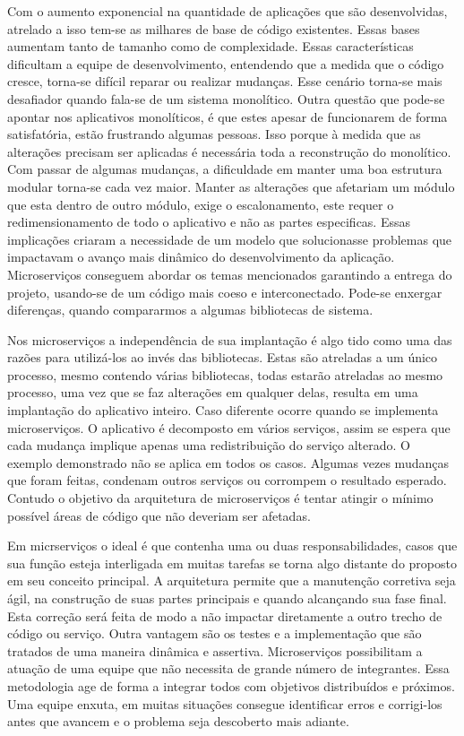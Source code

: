 Com o aumento exponencial na quantidade de aplicações que são desenvolvidas, atrelado a isso tem-se as milhares de base
de código existentes. Essas bases aumentam tanto de tamanho como de complexidade. Essas características dificultam a
equipe de desenvolvimento, entendendo que a medida que o código cresce, torna-se difícil reparar ou realizar mudanças.
Esse cenário torna-se mais desafiador quando fala-se de um sistema monolítico. Outra questão que pode-se apontar
nos aplicativos monolíticos, é que estes apesar de funcionarem de forma satisfatória, estão frustrando algumas pessoas.
Isso porque à medida que as alterações precisam ser aplicadas é necessária toda a reconstrução do monolítico. Com passar
de algumas mudanças, a dificuldade em manter uma boa estrutura modular torna-se cada vez maior. Manter as alterações
que  afetariam um módulo que esta dentro de outro módulo, exige o escalonamento, este requer o redimensionamento de todo
o aplicativo e não as partes especificas. Essas implicações criaram a necessidade de um modelo que solucionasse problemas
que impactavam o avanço mais dinâmico do desenvolvimento da aplicação.
Microserviços conseguem abordar os temas mencionados garantindo a entrega do projeto, usando-se de um código mais coeso
e interconectado.  Pode-se enxergar diferenças, quando compararmos a algumas bibliotecas de sistema.


Nos microserviços a independência de sua implantação é algo tido como uma das razões para utilizá-los ao invés das
bibliotecas. Estas são atreladas a um único processo, mesmo contendo várias bibliotecas, todas estarão atreladas ao mesmo
processo, uma vez que se faz alterações em qualquer delas, resulta em uma implantação do aplicativo inteiro. Caso diferente
ocorre quando se implementa microserviços. O aplicativo é decomposto em vários serviços, assim se espera que cada mudança
implique apenas uma redistribuição do serviço alterado. O exemplo demonstrado não se aplica em todos os casos. Algumas
vezes mudanças que foram feitas, condenam outros serviços ou corrompem o resultado esperado. Contudo o objetivo da
arquitetura de microserviços é tentar atingir o mínimo possível áreas de código que não deveriam ser afetadas.


Em micrserviços o ideal é que contenha uma ou duas responsabilidades, casos que sua função esteja interligada em muitas
tarefas se torna algo distante do proposto em seu conceito principal.
A arquitetura permite que a manutenção corretiva seja ágil, na construção de suas partes principais e quando alcançando sua
fase final. Esta correção será feita de modo a não impactar diretamente a outro trecho de código ou serviço. Outra vantagem
são os testes e a implementação que são tratados de uma maneira dinâmica e assertiva. Microserviços possibilitam a atuação
de uma equipe que não necessita de grande número de integrantes. Essa metodologia age de forma a integrar todos com
objetivos distribuídos e próximos. Uma equipe enxuta, em muitas situações consegue identificar erros e corrigi-los antes
que avancem e o problema seja descoberto mais adiante.


